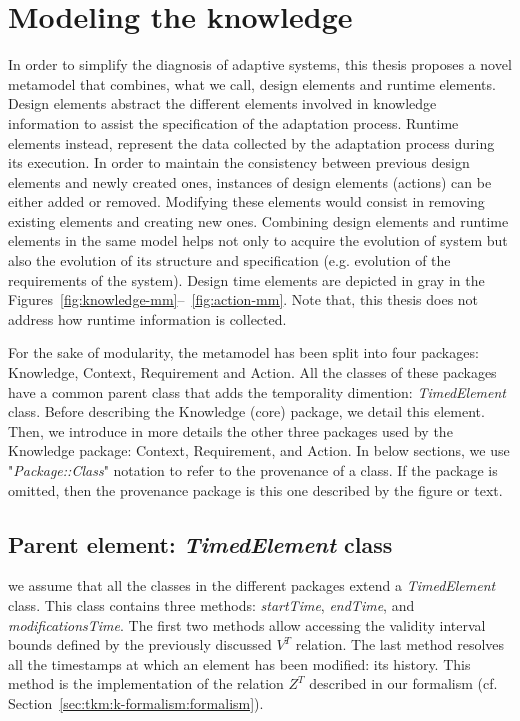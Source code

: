 \section{Modeling the knowledge}
\label{sec:tkm:mm}
 
 In order to simplify the diagnosis of adaptive systems, this thesis proposes a novel \gls{metamodel} that combines, what we call, design elements and runtime elements.
Design elements abstract the different elements involved in \gls{knowledge} information to assist the specification of the adaptation process.
Runtime elements instead, represent the data collected by the adaptation process during its execution.
In order to maintain the consistency between previous design elements and newly created ones, instances of design elements (\eg actions) can be either added or removed.
Modifying these elements would consist in removing existing elements and creating new ones.
Combining design elements and runtime elements in the same model helps not only to acquire the evolution of system but also the evolution of its structure and specification (e.g. evolution of the requirements of the system).
Design time elements are depicted in gray in the Figures~\ref{fig:knowledge-mm}--~\ref{fig:action-mm}.
Note that, this thesis does not address how runtime information is collected.

For the sake of modularity, the \gls{metamodel} has been split into four packages: Knowledge, Context, Requirement and Action.
All the classes of these packages have a common parent class that adds the temporality dimention: \textit{TimedElement} class.
Before describing the Knowledge (core) package, we detail this element.
Then, we introduce in more details the other three packages used by the Knowledge package: Context, Requirement, and Action. 
In below sections, we use "\textit{Package::Class}" notation to refer to the provenance of a class.
If the package is omitted, then the provenance package is this one described by the figure or text.

\subsection{Parent element: \textit{TimedElement} class}
we assume that all the classes in the different packages extend a \textit{TimedElement} class. 
This class contains three methods: \textit{startTime}, \textit{endTime}, and \textit{modificationsTime}.
The first two methods allow accessing the validity interval bounds defined by the previously discussed $V^T$ relation.
The last method resolves all the timestamps at which an element has been modified: its history. 
This method is the implementation of the relation $Z^T$ described in our formalism (cf. Section~\ref{sec:tkm:k-formalism:formalism}).


